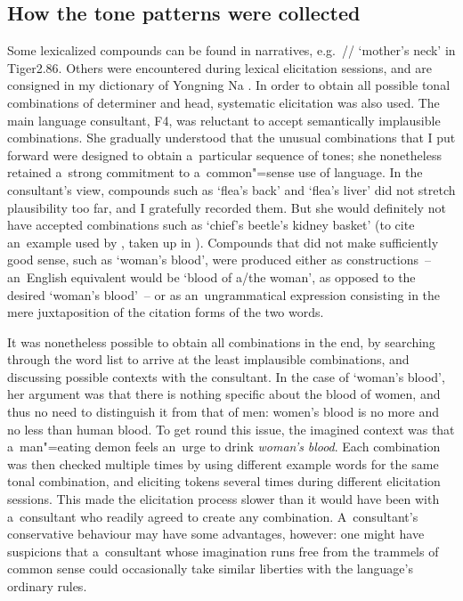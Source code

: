 \subsection{How the tone patterns were collected}
\label{sec:howthetonepatternswerecollected}
\largerpage[-1] %
Some lexicalized compounds can
be found in narratives, e.g.~// {\linebreak}‘mother’s neck’ in Tiger2.86. Others were encountered during lexical elicitation sessions, and are consigned in my dictionary of Yongning Na \citep{michauddict2015}. In order to obtain all possible tonal combinations of determiner and head,
systematic elicitation was also used. The main language consultant, F4, was reluctant to
accept semantically implausible combinations. She gradually understood that the unusual combinations
that I put forward were designed to obtain a~particular sequence of tones; she nonetheless retained
a~strong commitment to a~common"=sense use of language. In the consultant’s view, compounds such as ‘flea’s back’ and ‘flea’s liver’ did not stretch
plausibility too far, and I gratefully recorded them. But she would definitely not have accepted
combinations such as ‘chief’s beetle’s kidney basket’ (to cite an~example used by \citealt{hyman2007a}, taken
up in \citealt[225]{evans2010}). 
Compounds that did not make sufficiently good sense, such as ‘woman’s blood’, were produced either
as  constructions~-- an~{English} equivalent would be ‘blood of a/the woman’, as opposed to the
desired ‘woman’s blood’~-- or as an~ungrammatical expression consisting in the mere juxtaposition
of the citation forms of the two words. 

It was nonetheless possible to obtain all combinations in the end, by searching
through the word list to arrive at the least implausible combinations, and discussing possible
contexts with the consultant. In the case of ‘woman’s blood’, her argument was that there is nothing specific about the blood of women, and thus no need to distinguish it from that of men: women’s blood is no more and no less than human blood. To get round this issue, the imagined context was that a~man"=eating demon feels an~urge to drink \textit{woman’s} \textit{blood}. Each combination was then checked multiple times by using different example words for the same
tonal combination, and eliciting tokens several times during different elicitation sessions. 
This made the elicitation process slower than it would have been with a~consultant who
readily agreed to create any combination. 
A~consultant’s {conservative} behaviour may have some
advantages, however: one might have suspicions that a~consultant whose imagination runs free
from the trammels of common sense could occasionally take similar liberties with the language’s
ordinary rules.

